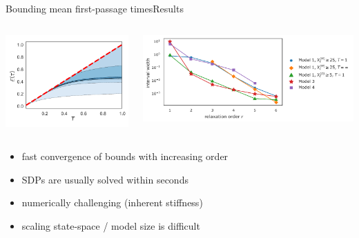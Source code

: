 \documentclass[9pt]{beamer}
\newcommand{\bottomcite}[1]{\vspace*{\fill} {\scriptsize \parencite{#1}}}
\begin{document}
\begin{frame}{Bounding mean first-passage times}{Results}
    \begin{columns}
        \begin{column}{.33\paperwidth}
            \includegraphics[width=\textwidth]{../gfx/mfpt_bounds.pdf}
        \end{column}
        \begin{column}{.57\paperwidth}
            \includegraphics[width=\textwidth]{../gfx/convergence.pdf}
        \end{column}
    \end{columns}
    \vspace{2em}
    \begin{itemize}
        \item fast convergence of bounds with increasing order
        \item SDPs are usually solved within seconds
        \item numerically challenging (inherent stiffness)
        \item scaling state-space / model size is difficult
    \end{itemize}
\bottomcite{backenkohler2019bounding}
\end{frame}
\end{document}
